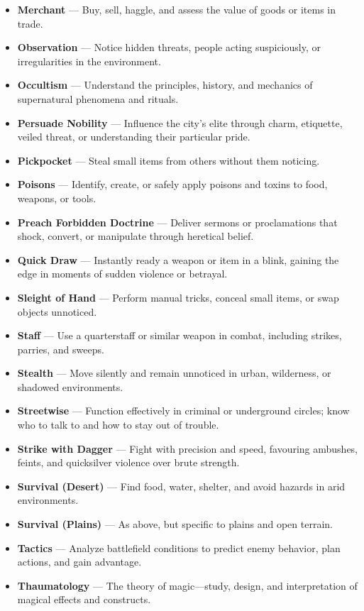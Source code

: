 \begin{itemize}
    \item \textbf{Merchant} — Buy, sell, haggle, and assess the value of goods or items in trade.
    \item \textbf{Observation} — Notice hidden threats, people acting suspiciously, or irregularities in the environment.
    \item \textbf{Occultism} — Understand the principles, history, and mechanics of supernatural phenomena and rituals.
    \item \textbf{Persuade Nobility} — Influence the city’s elite through charm, etiquette, veiled threat, or understanding their particular pride.
    \item \textbf{Pickpocket} — Steal small items from others without them noticing.
    \item \textbf{Poisons} — Identify, create, or safely apply poisons and toxins to food, weapons, or tools.
    \item \textbf{Preach Forbidden Doctrine} — Deliver sermons or proclamations that shock, convert, or manipulate through heretical belief.
    \item \textbf{Quick Draw} — Instantly ready a weapon or item in a blink, gaining the edge in moments of sudden violence or betrayal.
    \item \textbf{Sleight of Hand} — Perform manual tricks, conceal small items, or swap objects unnoticed.
    \item \textbf{Staff} — Use a quarterstaff or similar weapon in combat, including strikes, parries, and sweeps.
    \item \textbf{Stealth} — Move silently and remain unnoticed in urban, wilderness, or shadowed environments.
    \item \textbf{Streetwise} — Function effectively in criminal or underground circles; know who to talk to and how to stay out of trouble.
    \item \textbf{Strike with Dagger} — Fight with precision and speed, favouring ambushes, feints, and quicksilver violence over brute strength.
    \item \textbf{Survival (Desert)} — Find food, water, shelter, and avoid hazards in arid environments.
    \item \textbf{Survival (Plains)} — As above, but specific to plains and open terrain.
    \item \textbf{Tactics} — Analyze battlefield conditions to predict enemy behavior, plan actions, and gain advantage.
    \item \textbf{Thaumatology} — The theory of magic—study, design, and interpretation of magical effects and constructs.

\end{itemize}
